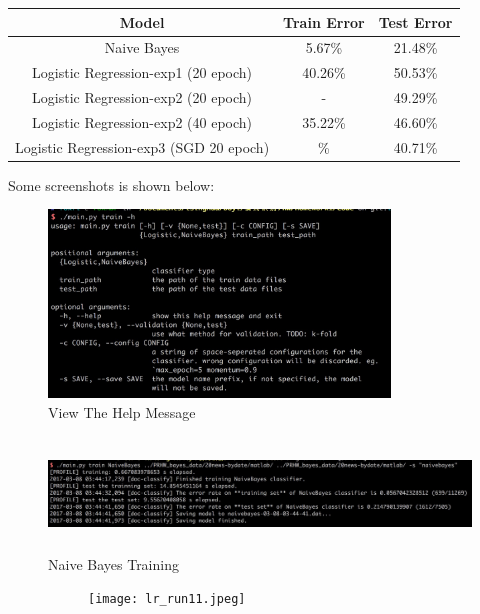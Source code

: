 \documentclass{article}
\theoremstyle{definition}
\theoremstyle{definition}
\theoremstyle{remark}
\begin{document}
\begin{addmargin}[3em]{2em}
  \begin{center}
    \begin{tabular}{ | c | c | c | }
      \hline
      Model & Train Error & Test Error\\\hline
      Naive Bayes & 5.67\% & 21.48\%\\
      Logistic Regression-exp1 (20 epoch) & 40.26\% & 50.53\%\\
      Logistic Regression-exp2 (20 epoch) & - & 49.29\%\\
      Logistic Regression-exp2 (40 epoch) & 35.22\% & 46.60\% \\
      Logistic Regression-exp3 (SGD 20 epoch) & \% & 40.71\% \\

      \hline
    \end{tabular}
  \end{center}
  Some screenshots is shown below:
  \begin{figure}
    \centering%
    \includegraphics[height=5cm]{help.jpeg}
    \caption{View The Help Message}
  \end{figure}

  \begin{figure}
    \centering%
    \includegraphics[height=3cm]{nb_run.jpeg}
    \caption{Naive Bayes Training}
  \end{figure}

  \begin{figure}[!tbp]
    \centering%
    \begin{subfigure}[b]{\columnwidth}
      \centering
      \texttt{[image: lr\_run11.jpeg]}
    \end{subfigure}


\end{figure}
\end{addmargin}
\end{document}
